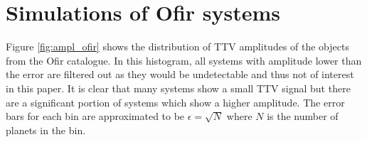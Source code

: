 \documentclass[12pt]{report}
\begin{document}
\section{Simulations of Ofir systems}
	Figure \ref{fig:ampl_ofir} shows the distribution of TTV amplitudes of the objects from the Ofir catalogue. In this histogram, all systems with amplitude lower than the error are filtered out as they would be undetectable and thus not of interest in this paper. It is clear that many systems show a small TTV signal but there are a significant portion of systems which show a higher amplitude. The error bars for each bin are approximated to be $\epsilon = \sqrt{N}$ where $N$ is the number of planets in the bin.

\end{document}
